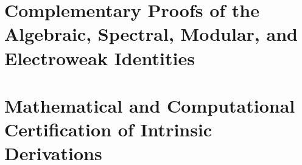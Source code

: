 \chapter{Complementary Proofs of the Algebraic, Spectral, Modular, and Electroweak Identities}
\label{hmt:p3:app:demostraciones-complementarias}


\chapter{Mathematical and Computational Certification of Intrinsic Derivations}
\label{hmt:p3:app:certificacion-constantes}

